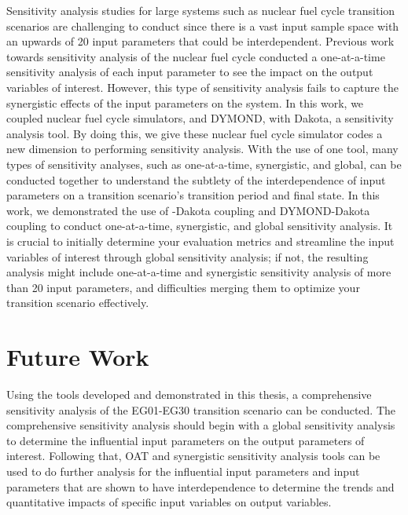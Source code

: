 Sensitivity analysis studies for large systems such as nuclear 
fuel cycle transition scenarios are challenging to conduct 
since there is a vast input sample space with an
upwards of 20 input parameters that could be interdependent. 
Previous work towards sensitivity analysis of the nuclear fuel cycle 
conducted a one-at-a-time sensitivity analysis of each input parameter 
to see the impact on the output variables of interest.
However, this type of sensitivity analysis fails to capture the 
synergistic effects of the input parameters on the system.  
In this work, we coupled nuclear fuel cycle simulators, \Cyclus and 
DYMOND, with Dakota, a sensitivity analysis tool. 
By doing this, we give these nuclear fuel cycle simulator codes 
a new dimension to performing sensitivity analysis.
With the use of one tool, many types of sensitivity analyses, 
such as one-at-a-time, synergistic, and global, 
can be conducted together to understand the subtlety of the 
interdependence of input parameters on a transition scenario's 
transition period and final state. 
In this work, we demonstrated the use of \Cyclus-Dakota coupling 
and DYMOND-Dakota coupling to conduct one-at-a-time, synergistic, and 
global sensitivity analysis. 
It is crucial to initially determine your evaluation metrics and 
streamline the input variables of interest through global sensitivity 
analysis; if not, the resulting analysis might include one-at-a-time and 
synergistic sensitivity analysis of more than 20 input parameters, 
and difficulties merging them to optimize your transition scenario 
effectively.

\section{Future Work}
Using the tools developed and demonstrated in this thesis, a comprehensive 
sensitivity analysis of the EG01-EG30 transition scenario can be conducted. 
The comprehensive sensitivity analysis should begin with a global
sensitivity analysis to determine the influential input parameters 
on the output parameters of interest. 
Following that, OAT and synergistic sensitivity analysis tools can 
be used to do further analysis for the influential input parameters and 
input parameters that are shown to have interdependence to 
determine the trends and quantitative impacts of specific input variables 
on output variables.  

